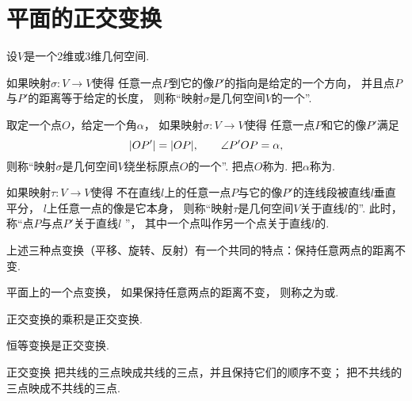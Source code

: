 \section{平面的正交变换}

设\(V\)是一个2维或3维几何空间.

如果映射\(\sigma\colon V \to V\)使得
任意一点\(P\)到它的像\(P'\)的指向是给定的一个方向，
并且点\(P\)与\(P'\)的距离等于给定的长度，
则称“映射\(\sigma\)是几何空间\(V\)的一个”.

取定一个点\(O\)，给定一个角\(\alpha\)，
如果映射\(\sigma\colon V \to V\)使得
任意一点\(P\)和它的像\(P'\)满足\begin{equation*}
	\abs{OP'}
	= \abs{OP},
	\qquad
	\angle P'OP = \alpha,
\end{equation*}
则称“映射\(\sigma\)是几何空间\(V\)绕坐标原点\(O\)的一个”.
把点\(O\)称为.
把\(\alpha\)称为.

如果映射\(\tau\colon V \to V\)使得
不在直线\(l\)上的任意一点\(P\)与它的像\(P'\)的连线段被直线\(l\)垂直平分，
\(l\)上任意一点的像是它本身，
则称“映射\(\tau\)是几何空间\(V\)关于直线\(l\)的”.
此时，称“点\(P\)与点\(P'\)关于直线\(l\) ”，
其中一个点叫作另一个点关于直线\(l\)的.

上述三种点变换（平移、旋转、反射）有一个共同的特点：保持任意两点的距离不变.

\begin{definition}
平面上的一个点变换，
如果保持任意两点的距离不变，
则称之为或.
\end{definition}

\begin{property}
正交变换的乘积是正交变换.
\end{property}

\begin{property}
恒等变换是正交变换.
\end{property}

\begin{property}
正交变换
把共线的三点映成共线的三点，并且保持它们的顺序不变；
把不共线的三点映成不共线的三点.
\end{property}

